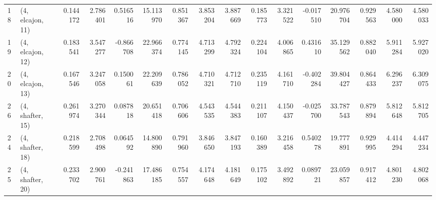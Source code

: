 \begin{tabular}{llrrrrrrrrrrrrrr}
18 &  (4, elcajon, 11) &   0.144172 &  2.786401 &  0.516516 &  15.113970 &  0.851367 &   3.853204 &  3.887669 &  0.185773 &   3.321522 & -0.017510 &   20.976704 &  0.929563 &   4.580000 &   4.580033 \\
19 &  (4, elcajon, 12) &   0.183541 &  3.547277 & -0.866708 &  22.966374 &  0.774145 &   4.713299 &  4.792324 &  0.224104 &   4.006865 &  0.431610 &   35.129562 &  0.882040 &   5.911284 &   5.927020 \\
20 &  (4, elcajon, 13) &   0.167546 &  3.247058 &  0.150061 &  22.209639 &  0.786052 &   4.710321 &  4.712710 &  0.235119 &   4.161710 & -0.402284 &   39.804427 &  0.864433 &   6.296237 &   6.309075 \\
26 &  (4, shafter, 15) &   0.261974 &  3.270344 &  0.087818 &  20.651418 &  0.706606 &   4.543535 &  4.544383 &  0.211107 &   4.150437 & -0.025700 &   33.787543 &  0.879894 &   5.812648 &   5.812705 \\
24 &  (4, shafter, 18) &   0.218599 &  2.708498 &  0.064592 &  14.800890 &  0.791960 &   3.846650 &  3.847193 &  0.160389 &   3.216458 &  0.540278 &   19.777891 &  0.929995 &   4.414294 &   4.447234 \\
25 &  (4, shafter, 20) &   0.233702 &  2.900761 & -0.241863 &  17.486185 &  0.754557 &   4.174648 &  4.181649 &  0.175102 &   3.492892 &  0.089721 &   23.059857 &  0.917412 &   4.801230 &   4.802068 \\
\bottomrule
\end{tabular}
